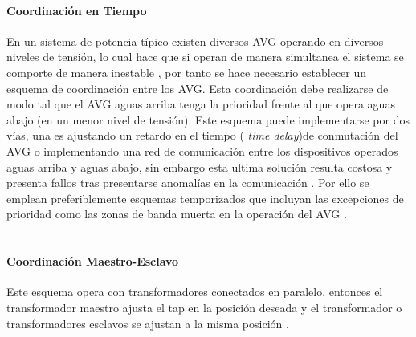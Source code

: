\documentclass[12pt, letterpaper]{report}
\begin{document}
\paragraph{Coordinación en Tiempo}
En un sistema de potencia típico existen diversos AVG operando  en diversos niveles de tensión, lo cual hace que si operan de manera simultanea el sistema se comporte de manera inestable \cite{Sarimuthu2016}, por tanto  se hace necesario  establecer un esquema de coordinación entre los AVG. Esta coordinación debe realizarse de modo tal que el AVG aguas arriba tenga la prioridad  frente al que opera aguas abajo (en un menor nivel de tensión).
Este esquema puede implementarse por dos vías, una es ajustando  un retardo en el tiempo ( \textit{time delay})de conmutación del AVG o implementando una red de comunicación entre los dispositivos operados aguas arriba y aguas abajo, sin embargo esta ultima solución resulta costosa y presenta fallos tras presentarse anomalías en la comunicación \cite{Sarimuthu2016}. Por ello se emplean preferiblemente esquemas temporizados que incluyan las excepciones  de prioridad como las zonas de banda muerta en la operación del AVG \cite{Sarimuthu2016}.\\\\
\paragraph{Coordinación Maestro-Esclavo}
Este esquema opera con transformadores conectados en paralelo,  entonces el transformador maestro ajusta el tap en la posición deseada  y el transformador o transformadores esclavos se ajustan a la misma posición \cite{Fila2007}\cite{Sarimuthu2016}. 
\end{document}

